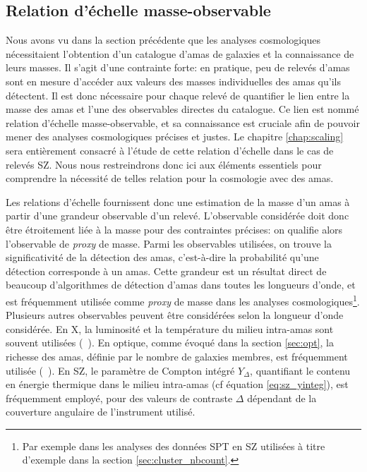 \subsection{Relation d'échelle masse-observable}\label{sec:scaling}

Nous avons vu dans la section précédente que les analyses cosmologiques nécessitaient l'obtention d'un catalogue d'amas de galaxies et la connaissance de leurs masses.
Il s'agit d'une contrainte forte: en pratique, peu de relevés d'amas sont en mesure d'accéder aux valeurs des masses individuelles des amas qu'ils détectent.
Il est donc nécessaire pour chaque relevé de quantifier le lien entre la masse des amas et l'une des observables directes du catalogue.
Ce lien est nommé relation d'échelle masse-observable, et sa connaissance est cruciale afin de pouvoir mener des analyses cosmologiques précises et justes.
Le chapitre \ref{chap:scaling} sera entièrement consacré à l'étude de cette relation d'échelle dans le cas de relevés SZ.
Nous nous restreindrons donc ici aux éléments essentiels pour comprendre la nécessité de telles relation pour la cosmologie avec des amas.

Les relations d'échelle fournissent donc une estimation de la masse d'un amas à partir d'une grandeur observable d'un relevé.
L'observable considérée doit donc être étroitement liée à la masse pour des contraintes précises: on qualifie alors l'observable de \textit{proxy} de masse.
Parmi les observables utilisées, on trouve la significativité de la détection des amas, c'est-à-dire la probabilité qu'une détection corresponde à un amas.
Cette grandeur est un résultat direct de beaucoup d'algorithmes de détection d'amas dans toutes les longueurs d'onde, et est fréquemment utilisée comme \textit{proxy} de masse dans les analyses cosmologiques\footnote{Par exemple dans les analyses des données SPT en SZ \cite{bocquet_cluster_2019} utilisées à titre d'exemple dans la section \ref{sec:cluster_nbcount}.}.
Plusieurs autres observables peuvent être considérées selon la longueur d'onde considérée.
En X, la luminosité et la température du milieu intra-amas sont souvent utilisées (\eg\ \cite{pacaud_xxl_2018}).
En optique, comme évoqué dans la section \ref{sec:opt}, la richesse des amas, définie par le nombre de galaxies membres, est fréquemment utilisée (\eg\ \cite{des_collaboration_dark_2020}).
En SZ, le paramètre de Compton intégré $Y_\Delta$, quantifiant le contenu en énergie thermique dans le milieu intra-amas (cf équation \ref{eq:sz_yinteg}), est fréquemment employé, pour des valeurs de contraste $\Delta$ dépendant de la couverture angulaire de l'instrument utilisé.

